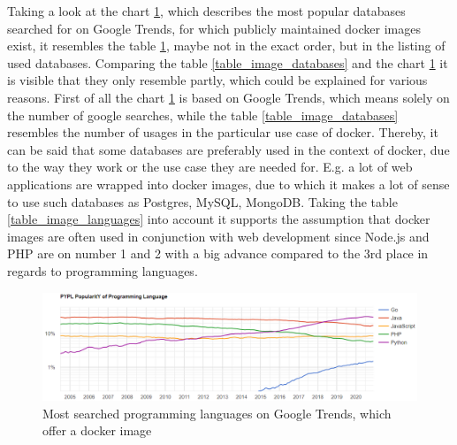 Taking a look at the chart \ref{fig:databases_top_ranking}, which describes the most popular databases searched for on Google Trends, for which publicly maintained docker images exist, it resembles the table \ref{fig:databases_top_ranking}, maybe not in the exact order, but in the listing of used databases.
Comparing the table \ref{table_image_databases} and the chart \ref{fig:databases_top_ranking} it is visible that they only resemble partly, which could be explained for various reasons. First of all the chart \ref{fig:databases_top_ranking} is based on Google Trends, which means solely on the number of google searches, while the table \ref{table_image_databases} resembles the number of usages in the particular use case of docker. Thereby, it can be said that some databases are preferably used in the context of docker, due to the way they work or the use case they are needed for. E.g. a lot of web applications are wrapped into docker images, due to which it makes a lot of sense to use such databases as Postgres, MySQL, MongoDB. Taking the table \ref{table_image_languages} into account it supports the assumption that docker images are often used in conjunction with web development since Node.js and PHP are on number 1 and 2 with a big advance compared to the 3rd place in regards to programming languages.

\begin{figure}[H]
    \centering
    \includegraphics[scale=0.5]{graphics/languages_top_popularity_ranking.png}
    \caption{Most searched programming languages on Google Trends, which offer a docker image}
    \label{fig:databases_top_ranking}
\end{figure}

